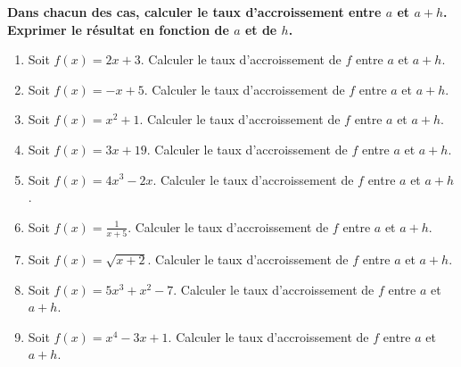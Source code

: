 \documentclass[11pt]{article}
\begin{document}
\begin{exercice}
\textbf{Dans chacun des cas, calculer le taux d'accroissement entre
$a$ et $a+h$. Exprimer le résultat en fonction de $a$ et de $h$.}
\begin{enumerate}
    \item Soit \( f(x) = 2x + 3 \). Calculer le taux d'accroissement de \( f \) entre \( a \) et \( a + h \).
    
    \item Soit \( f(x) = -x + 5 \). Calculer le taux d'accroissement de \( f \) entre \( a \) et \( a + h \).
    
    \item Soit \( f(x) = x^2 + 1 \). Calculer le taux d'accroissement de \( f \) entre \( a \) et \( a + h \).
    
    \item Soit \( f(x) = 3x + 19 \). Calculer le taux d'accroissement de \( f \) entre \( a \) et \( a + h \).
    
    \item Soit \( f(x) = 4x^3 - 2x \). Calculer le taux d'accroissement de \( f \) entre \( a \) et \( a + h \).
    
    \item Soit \( f(x) = \frac{1}{x+5} \). Calculer le taux d'accroissement de \( f \) entre \( a \) et \( a + h \).
    
    \item Soit \( f(x) = \sqrt{x+2} \). Calculer le taux d'accroissement de \( f \) entre \( a \) et \( a + h \).
    
    \item Soit \( f(x) = 5x^3 + x^2 - 7 \). Calculer le taux d'accroissement de \( f \) entre \( a \) et \( a + h \).
    
    \item Soit \( f(x) = x^4 - 3x + 1 \). Calculer le taux d'accroissement de \( f \) entre \( a \) et \( a + h \).
\end{enumerate}
\end{exercice}
\end{document}
